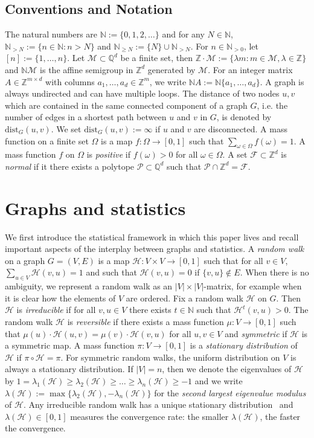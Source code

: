 \documentclass[11pt]{amsart}
\theoremstyle{definition}
\numberwithin{equation}{section}
\newcommand{\ring}[1]{\ensuremath{\mathbb{#1}}}
\renewcommand{\>}{\rangle}
\newcommand{\<}{\langle}
\newcommand{\0}{\mathbf{0}}
\newcommand{\1}{\mathbf{1}}
\newcommand{\2}{\mathbf{2}}
\newcommand\NN{\ring{N}}
\newcommand\QQ{\ring{Q}}
\newcommand\ZZ{\ring{Z}}
\newcommand\cF{{\mathcal F}}
\newcommand\cH{{\mathcal H}}
\newcommand\cM{{\mathcal M}}
\newcommand\cP{{\mathcal P}}
\newcommand{\dist}[3]{\mathrm{dist}_{#1}(#2,#3)}
\begin{document}
\subsection*{Conventions and Notation}
The natural numbers are $\NN:=\{0,1,2,\ldots\}$ and for any $N\in\NN$,
$\NN_{> N}:=\{n\in\NN: n> N\}$ and $\NN_{\ge N}:=\{N\}\cup \NN_{> N}$.
For $n\in\NN_{>0}$, let $[n]:=\{1,\ldots,n\}$. Let $\cM\subset\QQ^d$
be a finite set, then $\ZZ\cdot\cM:=\{\lambda m: m\in\cM,
\lambda\in\ZZ\}$ and $\NN\cM$ is the affine semigroup in $\ZZ^d$
generated by $\cM$. For an integer matrix $A\in\ZZ^{m\times d}$ with
columns $a_1,\dots,a_d\in\ZZ^m$, we write $\NN
A:=\NN\{a_1,\ldots,a_d\}$. A
graph is always undirected and can have multiple loops.
The distance of two nodes $u,v$ which are contained in the same
connected component of a graph $G$, i.e. the number of
edges in a shortest path between $u$ and $v$ in $G$, is denoted by
$\dist{G}{u}{v}$. We set $\dist{G}{u}{v}:=\infty$ if $u$
and $v$ are disconnected. A mass
function on a finite set $\Omega$ is a map $f:\Omega\to[0,1]$ such
that $\sum_{\omega\in\Omega}f(\omega)=1$. A mass function $f$ on
$\Omega$ is \emph{positive} if $f(\omega)>0$ for all
$\omega\in\Omega$.  A set $\cF\subset\ZZ^d$ is \emph{normal} if it there
exists a polytope $\cP\subset\QQ^d$ such that $\cP\cap\ZZ^d=\cF$. 

\section{Graphs and statistics}

We first introduce the statistical framework in which this paper
lives and recall important aspects of the interplay between graphs
and statistics. A \emph{random walk} on a graph $G=(V,E)$ is a map
$\cH:V\times V\to[0,1]$ such that for all $v\in V$, $\sum_{u\in
V}\cH(v,u)=1$ and such that $\cH(v,u)=0$ if $\{v,u\}\not\in E$. 
When there is no ambiguity, we represent a random walk as an
$|V|\times|V|$-matrix, for example when it is clear how the elements
of $V$ are ordered. Fix a random walk $\cH$ on $G$.  Then $\cH$ is
\emph{irreducible} if for all $v,u\in V$ there exists $t\in\NN$ such
that $\cH^t(v,u)>0$. The random
walk $\cH$ is \emph{reversible} if there exists a mass function
$\mu:V\to[0,1]$ such that $\mu(u)\cdot \cH(u,v)=\mu(v)\cdot \cH(v,u)$ for
all $u,v\in V$ and \emph{symmetric} if $\cH$ is a symmetric map. A
mass function $\pi:V\to[0,1]$ is a \emph{stationary distribution}
of $\cH$ if $\pi\circ \cH =\pi$. For symmetric random walks, the uniform
distribution on $V$ is always a stationary distribution. 
If $|V|=n$, then we denote the eigenvalues of $\cH$ by
$1=\lambda_1(\cH)\ge\lambda_2(\cH)\ge\dots\ge\lambda_n(\cH)\ge -1$ and we
write $\lambda(\cH):=\max\{\lambda_2(\cH),-\lambda_n(\cH)\}$ for the
\emph{second largest eigenvalue modulus} of $\cH$.  Any irreducible
random walk has a unique stationary
distribution~\cite[Corollary~1.17]{levin2008} and $\lambda(\cH)\in[0,1]$
measures the convergence rate: the smaller $\lambda(\cH)$,
the faster the convergence.
\end{document}
